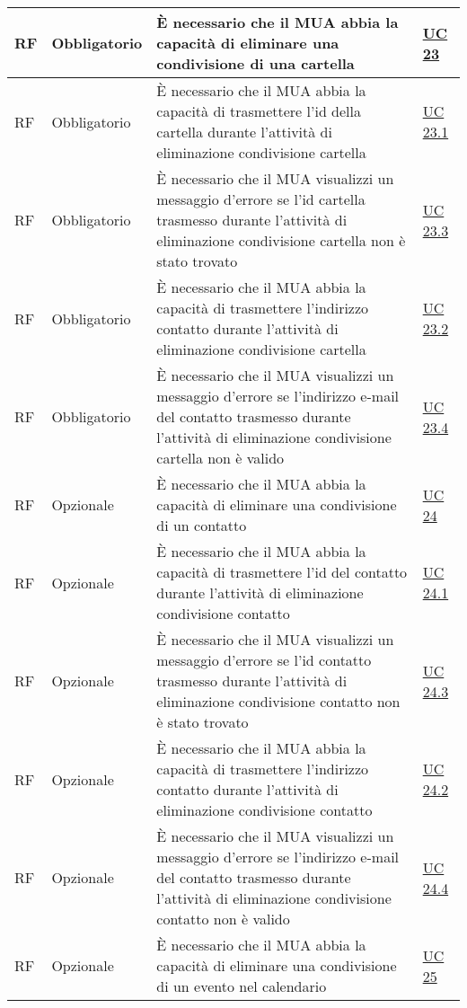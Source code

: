 \begin{longtable}{*{1}{>{\centering\arraybackslash}p{1.5cm}}*{1}{>{\centering\arraybackslash}p{2.5cm}}p{6cm}*{1}{>{\centering\arraybackslash}p{3cm}}}
    \\\hline
    RF & Obbligatorio & È necessario che il MUA abbia la capacità di eliminare una condivisione di una cartella & \hyperref[sec:UC23]{UC 23}
    \\\hline
    RF & Obbligatorio & È necessario che il MUA abbia la capacità di trasmettere l'id della cartella durante l'attività di eliminazione condivisione cartella & \hyperref[sec:UC23.1]{UC 23.1}
    \\\hline
    RF & Obbligatorio & È necessario che il MUA visualizzi un messaggio d'errore se l'id cartella trasmesso durante l'attività di eliminazione condivisione cartella non è stato trovato & \hyperref[sec:UC23.3]{UC 23.3}
    \\\hline
    RF & Obbligatorio & È necessario che il MUA abbia la capacità di trasmettere l'indirizzo contatto durante l'attività di eliminazione condivisione cartella & \hyperref[sec:UC23.2]{UC 23.2}
    \\\hline
    RF & Obbligatorio & È necessario che il MUA visualizzi un messaggio d'errore se l'indirizzo e-mail del contatto trasmesso durante l'attività di eliminazione condivisione cartella non è valido & \hyperref[sec:UC23.4]{UC 23.4}
    \\\hline
    RF & Opzionale & È necessario che il MUA abbia la capacità di eliminare una condivisione di un contatto & \hyperref[sec:UC24]{UC 24}
    \\\hline
    RF & Opzionale & È necessario che il MUA abbia la capacità di trasmettere l'id del contatto durante l'attività di eliminazione condivisione contatto & \hyperref[sec:UC24.1]{UC 24.1}
    \\\hline
    RF & Opzionale & È necessario che il MUA visualizzi un messaggio d'errore se l'id contatto trasmesso durante l'attività di eliminazione condivisione contatto non è stato trovato & \hyperref[sec:UC24.3]{UC 24.3}
    \\\hline
    RF & Opzionale & È necessario che il MUA abbia la capacità di trasmettere l'indirizzo contatto durante l'attività di eliminazione condivisione contatto & \hyperref[sec:UC24.2]{UC 24.2}
    \\\hline
    RF & Opzionale & È necessario che il MUA visualizzi un messaggio d'errore se l'indirizzo e-mail del contatto trasmesso durante l'attività di eliminazione condivisione contatto non è valido & \hyperref[sec:UC24.4]{UC 24.4}
    \\\hline
    RF & Opzionale & È necessario che il MUA abbia la capacità di eliminare una condivisione di un evento nel calendario & \hyperref[sec:UC25]{UC 25}

\end{longtable}

